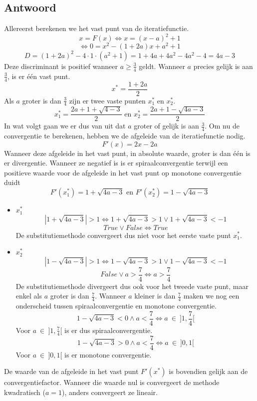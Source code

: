 \documentclass[examenvragen.tex]{subfiles}
\begin{document}
\subsection{Antwoord}
Allereerst berekenen we het vast punt van de iteratiefunctie.
\[
x = F(x) \Leftrightarrow x = (x-a)^2+1
\]
\[
\Leftrightarrow 0 = x^2-(1+2a)x+a^2+1
\]
\[
D = (1+2a)^2 - 4\cdot1\cdot(a^2+1) = 1+4a+4a^2-4a^2-4 = 4a-3
\]
Deze discriminant is positief wanneer $a \ge \frac{3}{4}$ geldt. 
Wanneer $a$ precies gelijk is aan $\frac{3}{4}$, is er \'e\'en vast punt.
\[
x^{*} = \frac{1+2a}{2}
\]
Als $a$ groter is dan $\frac{3}{4}$ zijn er twee vaste punten $x^{*}_{1}$ en $x^{*}_{2}$.
\[
x^{*}_1 = \frac{2a+1 +\sqrt{4-3}}{2} \text{ en } x^{*}_{2}= \frac{2a+1 -\sqrt{4a-3}}{2}
\]
In wat volgt gaan we er dus van uit dat $a$ groter of gelijk is aan $\frac{3}{4}$.
Om nu de convergentie te berekenen, hebben we de afgeleide van de iteratiefunctie nodig.
\[
F'(x) = 2x-2a
\]
Wanneer deze afgeleide in het vast punt, in absolute waarde, groter is dan \'e\'en is er divergentie. Wanneer ze negatief is is er spiraalconvergentie terwijl een positieve waarde voor de afgeleide in het vast punt op monotone convergentie duidt
\[
F'(x^{*}_1) = 1 +  \sqrt{4a-3} \text{ en } F'(x^{*}_2) = 1-\sqrt{4a-3}
\]
\begin{itemize}
\item $x_{1}^{*}$
\[
|1 + \sqrt{4a-3}| > 1 \Leftrightarrow 1 + \sqrt{4a-3} > 1 \vee  1 + \sqrt{4a-3} < -1
\]
\[
True \vee False \Leftrightarrow True
\]
De substitutiemethode convergeert dus niet voor het eerste vaste punt $x_1^{*}$.
\item $x_{2}^{*}$
\[
|1-\sqrt{4a-3}| > 1 \Leftrightarrow  1-\sqrt{4a-3} > 1 \vee 1-\sqrt{4a-3} <-1
\]
\[
False \vee a > \frac{7}{4} \Leftrightarrow a > \frac{7}{4}
\]
De substitutiemethode divergeert dus ook voor het tweede vaste punt, maar enkel als $a$ groter is dan $\frac{7}{4}$.
Wanneer $a$ kleiner is dan $\frac{7}{4}$ maken we nog een onderscheid tussen spiraalconvergentie en monotone convergentie.
\[
1-\sqrt{4a-3} < 0 \wedge a < \frac{7}{4} \Leftrightarrow a\ \in\  ]1,\frac{7}{4}[
\]
Voor $a\ \in\ ]1,\frac{7}{4}[$ is er dus spiraalconvergentie.
\[
1-\sqrt{4a-3} > 0 \wedge a < \frac{7}{4} \Leftrightarrow a\ \in\ ]0,1[
\]
Voor $a\ \in\ ]0,1[$ is er monotone convergentie.
\end{itemize}
De waarde van de afgeleide in het vast punt $F'(x^*)$ is bovendien gelijk aan de convergentiefactor. Wanneer die waarde nul is convergeert de methode kwadratisch ($a = 1$), anders convergeert ze lineair.
\end{document}
